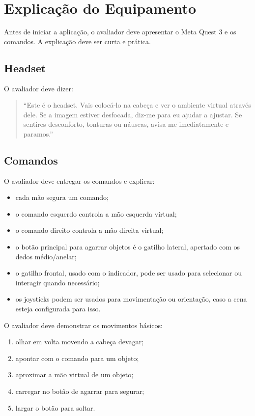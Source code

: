 \documentclass[12pt,a4paper,oneside]{report}
\begin{document}
\section{Explicação do Equipamento}

Antes de iniciar a aplicação, o avaliador deve apresentar o Meta Quest 3 e os comandos. A explicação deve ser curta e prática.

\subsection{Headset}

O avaliador deve dizer:

\begin{quote}
    ``Este é o headset. Vais colocá-lo na cabeça e ver o ambiente virtual através dele. Se a imagem estiver desfocada, diz-me para eu ajudar a ajustar. Se sentires desconforto, tonturas ou náuseas, avisa-me imediatamente e paramos.''
\end{quote}

\subsection{Comandos}

O avaliador deve entregar os comandos e explicar:

\begin{itemize}
    \item cada mão segura um comando;
    \item o comando esquerdo controla a mão esquerda virtual;
    \item o comando direito controla a mão direita virtual;
    \item o botão principal para agarrar objetos é o gatilho lateral, apertado com os dedos médio/anelar;
    \item o gatilho frontal, usado com o indicador, pode ser usado para selecionar ou interagir quando necessário;
    \item os joysticks podem ser usados para movimentação ou orientação, caso a cena esteja configurada para isso.
\end{itemize}

O avaliador deve demonstrar os movimentos básicos:

\begin{enumerate}
    \item olhar em volta movendo a cabeça devagar;
    \item apontar com o comando para um objeto;
    \item aproximar a mão virtual de um objeto;
    \item carregar no botão de agarrar para segurar;
    \item largar o botão para soltar.
\end{enumerate}
\end{document}
